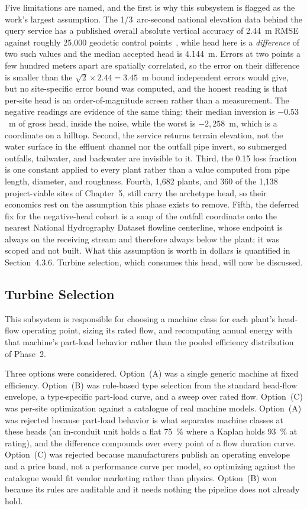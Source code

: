 \documentclass[12pt,letterpaper]{report}
\begin{document}
Five limitations are named, and the first is why this subsystem is flagged as the
work's largest assumption. The 1/3~arc-second national elevation data behind the
query service has a published overall absolute vertical accuracy of 2.44~m RMSE
against roughly 25{,}000 geodetic control points~\cite{usgs_ned_accuracy}, while
head here is a \emph{difference} of two such values and the median accepted head
is 4.144~m. Errors at two points a few hundred meters apart are spatially
correlated, so the error on their difference is smaller than the
$\sqrt{2} \times 2.44 = 3.45$~m bound independent errors would give, but no
site-specific error bound was computed, and the honest reading is that per-site
head is an order-of-magnitude screen rather than a measurement. The negative
readings are evidence of the same thing: their median inversion is $-0.53$~m of
gross head, inside the noise, while the worst is $-2{,}258$~m, which is a
coordinate on a hilltop. Second, the service returns terrain elevation, not the
water surface in the effluent channel nor the outfall pipe invert, so submerged
outfalls, tailwater, and backwater are invisible to it. Third, the 0.15 loss
fraction is one constant applied to every plant rather than a value computed from
pipe length, diameter, and roughness. Fourth, 1{,}682 plants, and 360 of the
1{,}138 project-viable sites of Chapter~5, still carry the archetype head, so
their economics rest on the assumption this phase exists to remove. Fifth, the
deferred fix for the negative-head cohort is a snap of the outfall coordinate
onto the nearest National Hydrography Dataset flowline centerline, whose endpoint
is always on the receiving stream and therefore always below the plant; it was
scoped and not built. What this assumption is worth in dollars is quantified in
Section~4.3.6. Turbine selection, which consumes this head, will now be
discussed.

\subsection{Turbine Selection}

This subsystem is responsible for choosing a machine class for each plant's
head-flow operating point, sizing its rated flow, and recomputing annual energy
with that machine's part-load behavior rather than the pooled efficiency
distribution of Phase~2.

Three options were considered. Option~(A) was a single generic machine at fixed
efficiency. Option~(B) was rule-based type selection from the standard head-flow
envelope, a type-specific part-load curve, and a sweep over rated flow.
Option~(C) was per-site optimization against a catalogue of real machine models.
Option~(A) was rejected because part-load behavior is what separates machine
classes at these heads (an in-conduit unit holds a flat 75~\% where a Kaplan
holds 93~\% at rating), and the difference compounds over every point of a flow
duration curve. Option~(C) was rejected because manufacturers publish an
operating envelope and a price band, not a performance curve per model, so
optimizing against the catalogue would fit vendor marketing rather than physics.
Option~(B) won because its rules are auditable and it needs nothing the pipeline
does not already hold.
\end{document}
